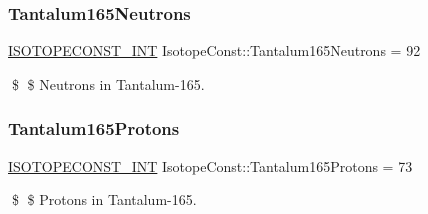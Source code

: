 \subsubsection{\texorpdfstring{Tantalum165\+Neutrons}{Tantalum165Neutrons}}
{\footnotesize\ttfamily \mbox{\hyperlink{group___isotope_const-_macros_ga5f18360b3e99483a35c32d789e62621c}{I\+S\+O\+T\+O\+P\+E\+C\+O\+N\+S\+T\+\_\+\+I\+NT}} Isotope\+Const\+::\+Tantalum165\+Neutrons = 92}

\$ \$ Neutrons in Tantalum-\/165. \mbox{\label{group___isotope_const-_tantalum-_ta165_ga230a1305220ed00d827f6eb38b733149}} 
\subsubsection{\texorpdfstring{Tantalum165\+Protons}{Tantalum165Protons}}
{\footnotesize\ttfamily \mbox{\hyperlink{group___isotope_const-_macros_ga5f18360b3e99483a35c32d789e62621c}{I\+S\+O\+T\+O\+P\+E\+C\+O\+N\+S\+T\+\_\+\+I\+NT}} Isotope\+Const\+::\+Tantalum165\+Protons = 73}

\$ \$ Protons in Tantalum-\/165. 